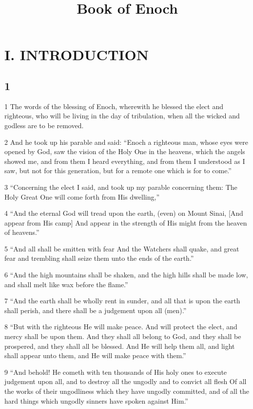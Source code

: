 

\title{Book of Enoch}

\part{I. INTRODUCTION}

\chapter{1}

\par 1 The words of the blessing of Enoch, wherewith he blessed the elect and righteous, who will be living in the day of tribulation, when all the wicked and godless are to be removed.
\par 2 And he took up his parable and said: “Enoch a righteous man, whose eyes were opened by God, saw the vision of the Holy One in the heavens, which the angels showed me, and from them I heard everything, and from them I understood as I saw, but not for this generation, but for a remote one which is for to come.”
\par 3 “Concerning the elect I said, and took up my parable concerning them: The Holy Great One will come forth from His dwelling,”
\par 4 “And the eternal God will tread upon the earth, (even) on Mount Sinai, [And appear from His camp] And appear in the strength of His might from the heaven of heavens.”
\par 5 “And all shall be smitten with fear And the Watchers shall quake, and great fear and trembling shall seize them unto the ends of the earth.”
\par 6 “And the high mountains shall be shaken, and the high hills shall be made low, and shall melt like wax before the flame.”
\par 7 “And the earth shall be wholly rent in sunder, and all that is upon the earth shall perish, and there shall be a judgement upon all (men).”
\par 8 “But with the righteous He will make peace. And will protect the elect, and mercy shall be upon them. And they shall all belong to God, and they shall be prospered, and they shall all be blessed. And He will help them all, and light shall appear unto them, and He will make peace with them.”
\par 9 “And behold! He cometh with ten thousands of His holy ones to execute judgement upon all, and to destroy all the ungodly and to convict all flesh Of all the works of their ungodliness which they have ungodly committed, and of all the hard things which ungodly sinners have spoken against Him.”

